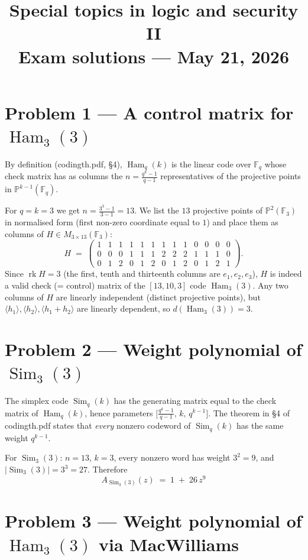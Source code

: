 \documentclass[11pt,a4paper]{article}
\title{\textbf{Special topics in logic and security II\\Exam solutions --- May 21, 2026}}
\author{}
\date{}
\newcommand{\F}{\mathbb{F}}
\newcommand{\PP}{\mathbb{P}}
\newcommand{\Ham}{\operatorname{Ham}}
\newcommand{\Sim}{\operatorname{Sim}}
\begin{document}
\maketitle

\section*{Problem 1 --- A control matrix for $\Ham_3(3)$}

By definition (codingth.pdf, \S4), $\Ham_q(k)$ is the linear code over $\F_q$ whose check matrix has as columns the $n=\frac{q^k-1}{q-1}$ representatives of the projective points in $\PP^{k-1}(\F_q)$.

For $q=k=3$ we get $n=\frac{3^3-1}{3-1}=13$. We list the $13$ projective points of $\PP^{2}(\F_3)$ in normalised form (first non-zero coordinate equal to $1$) and place them as columns of $H\in M_{3\times 13}(\F_3)$:
\[
H \;=\; \left(\begin{array}{ccccccccc|ccc|c}
1 & 1 & 1 & 1 & 1 & 1 & 1 & 1 & 1 & 0 & 0 & 0 & 0\\
0 & 0 & 0 & 1 & 1 & 1 & 2 & 2 & 2 & 1 & 1 & 1 & 0\\
0 & 1 & 2 & 0 & 1 & 2 & 0 & 1 & 2 & 0 & 1 & 2 & 1
\end{array}\right).
\]
Since $\operatorname{rk}H=3$ (the first, tenth and thirteenth columns are $e_1,e_2,e_3$), $H$ is indeed a valid check (= control) matrix of the $[13,10,3]$ code $\Ham_3(3)$. Any two columns of $H$ are linearly independent (distinct projective points), but $\langle h_1\rangle, \langle h_2\rangle, \langle h_1+h_2\rangle$ are linearly dependent, so $d(\Ham_3(3))=3$.

\section*{Problem 2 --- Weight polynomial of $\Sim_3(3)$}

The simplex code $\Sim_q(k)$ has the generating matrix equal to the check matrix of $\Ham_q(k)$, hence parameters $\bigl[\tfrac{q^k-1}{q-1},\,k,\,q^{k-1}\bigr]$. The theorem in \S4 of codingth.pdf states that \emph{every} nonzero codeword of $\Sim_q(k)$ has the same weight $q^{k-1}$.

For $\Sim_3(3)$: $n=13$, $k=3$, every nonzero word has weight $3^{2}=9$, and $|\Sim_3(3)|=3^3=27$. Therefore
\[
\boxed{\,A_{\Sim_3(3)}(z) \;=\; 1 \;+\; 26\,z^{9}\,}
\]

\section*{Problem 3 --- Weight polynomial of $\Ham_3(3)$ via MacWilliams}
\end{document}
